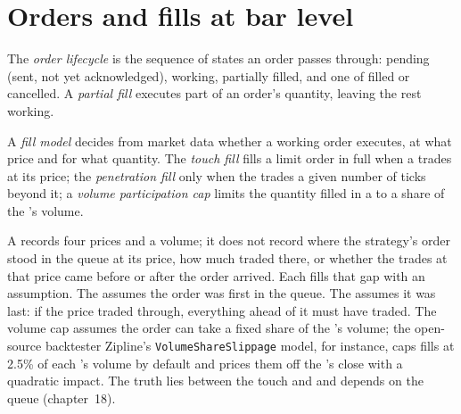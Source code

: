 \section{Orders and fills at bar level}

\begin{definition}\label{def:rs:event-driven-backtests:lifecycle}
The \emph{order lifecycle} is the sequence of states an order passes through: pending (sent, not yet acknowledged),
working, partially filled, and one of filled or cancelled. A \emph{partial fill} executes part of an order's quantity, leaving
the rest working.
\end{definition}

\begin{definition}\label{def:rs:event-driven-backtests:fill}
A \emph{fill model} decides from market data whether a working order executes, at what price and for what quantity. The
\emph{touch fill} fills a limit order in full when a  trades at its price; the \emph{penetration fill}
only when the  trades a given number of ticks beyond it; a \emph{volume participation cap} limits the quantity
filled in a  to a share of the 's volume.
\end{definition}

A  records four prices and a volume; it does not record where the strategy's order stood in the queue at its price, how much traded there, or
whether the trades at that price came before or after the order arrived. Each  fills that gap with an assumption. The  assumes
the order was first in the queue. The  assumes it was last: if the price traded through, everything ahead of it must have traded.
The volume cap assumes the order can take a fixed share of the 's volume; the open-source backtester Zipline's \texttt{VolumeShareSlippage}
model, for instance, caps fills at 2.5\% of each 's volume by default and prices them off the 's close with a quadratic impact. The truth lies
between the touch and  and depends on the queue (chapter~18).

